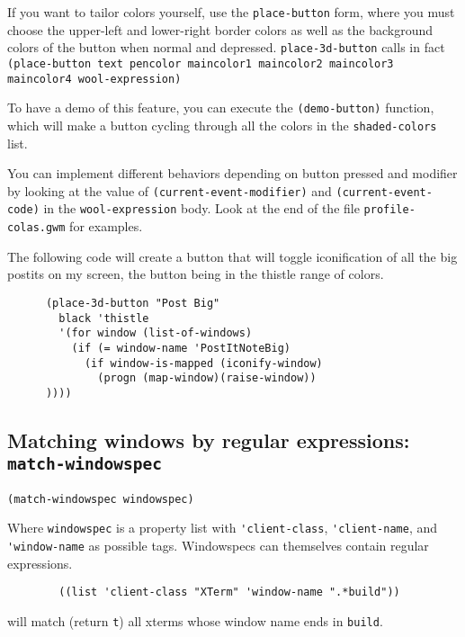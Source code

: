 If you want to tailor colors yourself, use the \verb|place-button| form, where
you must choose the upper-left and lower-right border colors as well as the
background colors of the button when normal and depressed.
\verb|place-3d-button| calls in fact {\tt (place-button text pencolor
maincolor1 maincolor2 maincolor3 maincolor4 wool-expression)}

To have a demo of this feature, you can execute the \verb|(demo-button)|
function, which will make a button cycling through all the colors in the
\verb|shaded-colors| list.

You can implement different behaviors depending on button pressed and modifier
by looking at the value of \verb|(current-event-modifier)| and
\verb|(current-event-code)| in the \verb|wool-expression| body. Look at the
end of the file \verb|profile-colas.gwm| for examples.

The following code will create a button that will toggle iconification of all
the big postits on my screen, the button being in the thistle range of colors.

{\exemplefont\begin{verbatim}
      (place-3d-button "Post Big"
        black 'thistle
        '(for window (list-of-windows) 
          (if (= window-name 'PostItNoteBig)
            (if window-is-mapped (iconify-window)
              (progn (map-window)(raise-window))
      ))))
\end{verbatim}}
 
\centerline{}

\subsection{Matching windows by regular expressions: {\tt match-windowspec}}
\label{match-windowspec}

{\usagefont\begin{verbatim}
(match-windowspec windowspec)
\end{verbatim}}\usageupspace

Where \verb|windowspec| is a property list with \verb|'client-class|,
\verb|'client-name|,  and \verb|'window-name| as possible tags. Windowspecs 
can themselves contain regular expressions.

{\exemplefont\begin{verbatim}
        ((list 'client-class "XTerm" 'window-name ".*build"))
\end{verbatim}}
will match (return \verb|t|) all xterms whose window name ends in \verb|build|.

